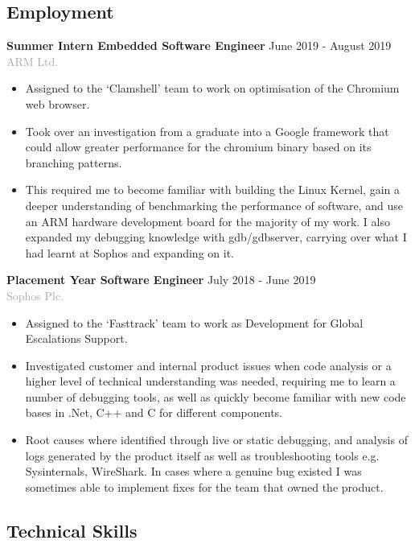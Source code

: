 \documentclass[11pt]{article}
\newcommand{\dash}{\item[-]}
\newcommand{\linesep}{\noindent\makebox[\linewidth]{\rule{\linewidth}{0.2pt}}}
\begin{document}
 \linesep
 \subsection*{Employment}
\textbf{Summer Intern Embedded Software Engineer} \hfill June 2019 - August 2019 \\
\textcolor{darkgray}{ARM Ltd.}
  \begin{itemize}
   \dash Assigned to the ‘Clamshell’ team to work on optimisation of the Chromium web browser.
   \dash Took over an investigation from a graduate into a Google framework that could allow greater performance for the chromium binary based on its branching patterns.
   \dash This required me to become familiar with building the Linux Kernel, gain a deeper understanding of benchmarking the performance of software, and use an ARM hardware development board for the majority of my work. I also expanded my debugging knowledge with gdb/gdbserver, carrying over what I had learnt at Sophos and expanding on it.
  \end{itemize}
\vspace{10pt}
\textbf{Placement Year Software Engineer} \hfill July 2018 - June 2019 \\
\textcolor{darkgray}{Sophos Plc.}
  \begin{itemize}
   \dash Assigned to the ‘Fasttrack’ team to work as Development for Global Escalations Support.
   \dash Investigated customer and internal product issues when code analysis or a higher level of technical understanding was needed, requiring me to learn a number of debugging tools, as well as quickly become familiar with new code bases in .Net, C++ and C for different components.
   \dash Root causes where identified through live or static debugging, and analysis of logs generated by the product itself as well as troubleshooting tools e.g. Sysinternals, WireShark. In cases where a genuine bug existed I was sometimes able to implement fixes for the team that owned the product.
  \end{itemize}

  \linesep

  \subsection*{Technical Skills}
   \renewcommand\tabularxcolumn[1]{b{#1}}%
\end{document}
